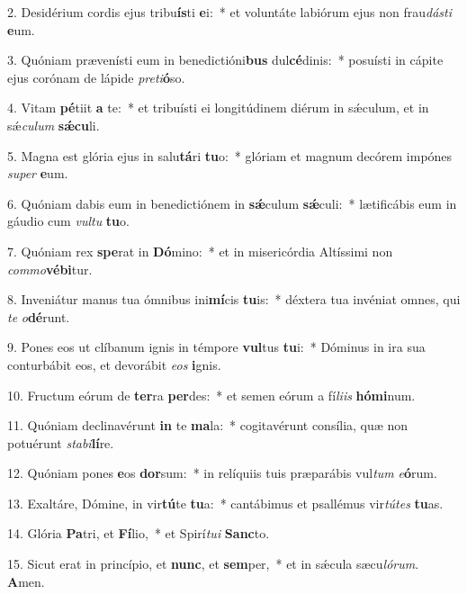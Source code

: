 2. Desidérium cordis ejus tribu\textbf{ís}ti \textbf{e}i:~*  et voluntáte labiórum ejus non frau\textit{dás}\textit{ti} \textbf{e}um.\

3. Quóniam prævenísti eum in benedictióni\textbf{bus} dul\textbf{cé}dinis:~*  posuísti in cápite ejus corónam de lápide \textit{pre}\textit{ti}\textbf{ó}so.\

4. Vitam \textbf{pé}tiit \textbf{a} te:~*  et tribuísti ei longitúdinem diérum in sǽculum, et in sǽ\textit{cu}\textit{lum} \textbf{sǽ}\textbf{cu}li.\

5. Magna est glória ejus in salu\textbf{tá}ri \textbf{tu}o:~*  glóriam et magnum decórem impónes \textit{su}\textit{per} \textbf{e}um.\

6. Quóniam dabis eum in benedictiónem in \textbf{sǽ}culum \textbf{sǽ}culi:~*  lætificábis eum in gáudio cum \textit{vul}\textit{tu} \textbf{tu}o.\

7. Quóniam rex \textbf{spe}rat in \textbf{Dó}mino:~*  et in misericórdia Altíssimi non \textit{com}\textit{mo}\textbf{vé}\textbf{bi}tur.\

8. Inveniátur manus tua ómnibus ini\textbf{mí}cis \textbf{tu}is:~*  déxtera tua invéniat omnes, qui \textit{te} \textit{o}\textbf{dé}runt.\

9. Pones eos ut clíbanum ignis in témpore \textbf{vul}tus \textbf{tu}i:~*  Dóminus in ira sua conturbábit eos, et devorábit \textit{e}\textit{os} \textbf{i}gnis.\

10. Fructum eórum de \textbf{ter}ra \textbf{per}des:~*  et semen eórum a fí\textit{li}\textit{is} \textbf{hó}\textbf{mi}num.\

11. Quóniam declinavérunt \textbf{in} te \textbf{ma}la:~*  cogitavérunt consília, quæ non potuérunt \textit{sta}\textit{bi}\textbf{lí}re.\

12. Quóniam pones \textbf{e}os \textbf{dor}sum:~*  in relíquiis tuis præparábis vul\textit{tum} \textit{e}\textbf{ó}rum.\

13. Exaltáre, Dómine, in vir\textbf{tú}te \textbf{tu}a:~*  cantábimus et psallémus vir\textit{tú}\textit{tes} \textbf{tu}as.\

14. Glória \textbf{Pa}tri, et \textbf{Fí}lio,~*  et Spirí\textit{tu}\textit{i} \textbf{Sanc}to.\

15. Sicut erat in princípio, et \textbf{nunc}, et \textbf{sem}per,~*  et in sǽcula sæcu\textit{ló}\textit{rum}. \textbf{A}men.\

